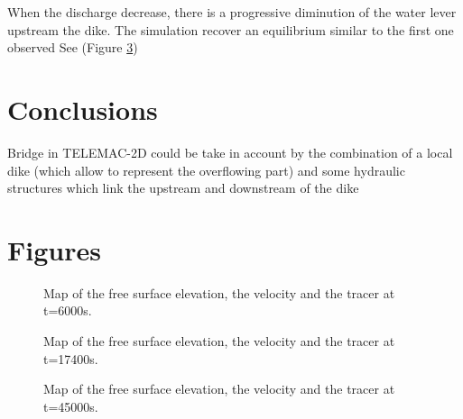 When the discharge decrease, there is a progressive diminution of the water lever upstream
 the dike. The simulation recover an equilibrium similar to the first one observed
 See (Figure \ref{fig:bridge:surf2})

\section{ Conclusions}

Bridge in TELEMAC-2D could be take in account by the combination of a local dike (which allow
 to represent the overflowing part) and some hydraulic structures which link the upstream and
 downstream of the dike

\section{ Figures}

\begin{figure}
\centering
 \caption{Map of the free surface elevation, the velocity and the tracer at t=6000s.}\label{fig:bridge:surf0}
\end{figure}

\begin{figure}
\centering
 \caption{Map of the free surface elevation, the velocity and the tracer at t=17400s.}\label{fig:bridge:surf1}
\end{figure}

\begin{figure}
\centering
 \caption{Map of the free surface elevation, the velocity and the tracer at t=45000s.}\label{fig:bridge:surf2}
\end{figure}

